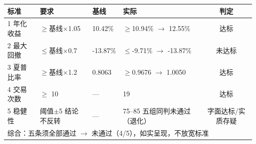 \begin{tabular}{llllc}
\toprule
标准 & 要求 & 基线 & 实际 & 判定 \\
\midrule
1 年化收益 & $\geq$基线$\times$1.05 & 10.42\% & $\geq$10.94\% $\to$ 12.55\% & 达标 \\
2 最大回撤 & $\leq$基线$\times$0.7 & -13.87\% & $\leq$-9.71\% $\to$ -13.87\% & {\color{red}未达标} \\
3 夏普比率 & $\geq$基线$\times$1.2 & 0.8063 & $\geq$0.9676 $\to$ 1.0050 & 达标 \\
4 交易次数 & $\geq$ 10 & --- & 19 & 达标 \\
5 稳健性 & 阈值$\pm$5 结论不反转 & --- & 75--85 五组同判未通过（退化） & 字面达标/实质存疑 \\
\midrule
\multicolumn{5}{l}{综合：五条须全部通过 $\to$ {\color{red}未通过（4/5），如实呈现，不放宽标准}} \\
\bottomrule
\end{tabular}
